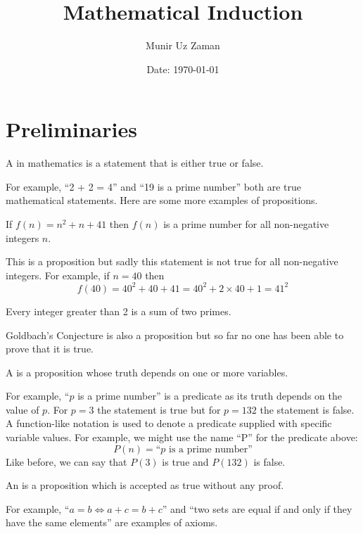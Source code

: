 \documentclass[11pt,numbers=noenddot,svgnames,dvipsnames]{scrartcl}
\title{Mathematical Induction}
\author{Munir Uz Zaman}
\date{Date: \today}
\begin{document}
\maketitle

\section{Preliminaries}
\begin{definition}
A  in mathematics is a statement that is either true or false.
\end{definition}
For example, ``2 + 2 = 4'' and ``19 is a prime number'' both are true mathematical statements. 
Here are some more examples of propositions.
\begin{proposition}
    If $f(n) = n^{2} + n + 41$ then $f(n)$ is a prime number for all non-negative integers $n$.
\end{proposition}
This is a proposition but sadly this statement is not true for all non-negative integers. 
For example, if $n=40$ then 
\[
    f(40) = 40^{2} + 40 + 41 = 40^{2} + 2\times 40 + 1 = 41^{2}
\]
\begin{proposition}
    Every integer greater than 2 is a sum of two primes.
\end{proposition}
Goldbach's Conjecture is also a proposition but so far no one has been able to 
prove that it is true.

\begin{definition}
    A  is a proposition whose truth depends on one or more variables.
\end{definition}
For example, ``$p$ is a prime number'' is a predicate as its truth depends on the value of $p$. 
For $p=3$ the statement is true but for $p=132$ the statement is false. 
A function-like notation is used to denote a predicate supplied with specific variable values. 
For example, we might use the name ``P'' for the predicate above:
\[
P(n) = \text{``}p\text{ is a prime number''}
\]
Like before, we can say that $P(3)$ is true and $P(132)$ is false.

\begin{definition}
    An  is a proposition which is accepted as true without any proof.
\end{definition}
For example, ``$a = b \iff a + c = b + c$'' and ``two sets are equal if and only if they have the same elements'' are 
examples of axioms.
\end{document}
